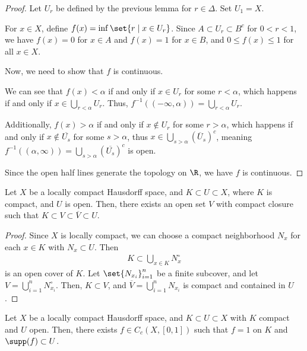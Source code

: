 \documentclass[10pt]{mypackage}
\begin{document}
\begin{proof}
  Let $U_r$ be defined by the previous lemma for $r\in \Delta$. Set $U_1 = X$.\newline

  For $x\in X$, define $f(x) = \inf\set{r\mid x\in U_r}$. Since $A\subset U_r \subset B^{c}$ for $0 < r < 1$, we have $f(x) = 0$ for $x\in A$ and $f(x) = 1$ for $x\in B$, and $0 \leq f(x) \leq 1$ for all $x\in X$.\newline

  Now, we need to show that $f$ is continuous. \newline

  We can see that $f(x) < \alpha$ if and only if $x\in U_{r}$ for some $r < \alpha$, which happens if and only if $x\in \bigcup_{r < \alpha}U_r$. Thus, $f^{-1}\left(\left(-\infty,\alpha\right)\right) = \bigcup_{r < \alpha}U_r$.\newline

  Additionally, $f(x) > \alpha$ if and only if $x\notin U_r$ for some $r > \alpha$, which happens if and only if $x\notin \overline{U_s}$ for some $s > \alpha$, thus $x\in \bigcup_{s > \alpha}\left(\overline{U}_{s}\right)^c$, meaning $f^{-1}\left(\left(\alpha,\infty\right)\right) = \bigcup_{s > \alpha}\left(\overline{U_s}\right)^c$ is open.\newline

  Since the open half lines generate the topology on $\R$, we have $f$ is continuous.
\end{proof}
\begin{proposition}
  Let $X$ be a locally compact Hausdorff space, and $K\subset U\subset X$, where $K$ is compact, and $U$ is open. Then, there exists an open set $V$ with compact closure such that $K\subset V\subset \overline{V}\subset U$.
\end{proposition}
\begin{proof}
  Since $X$ is locally compact, we can choose a compact neighborhood $N_x$ for each $x\in K$ with $N_x\subset U$. Then
  \begin{align*}
    K\subset \bigcup_{x\in K}N_x^{\circ}
  \end{align*}
  is an open cover of $K$. Let $\set{N_{x_i}}_{i=1}^{n}$ be a finite subcover, and let $V = \bigcup_{i=1}^{n}N_{x_i}^{\circ}$. Then, $K\subset V$, and $\overline{V} = \bigcup_{i=1}^{n}N_{x_i}$ is compact and contained in $U$.
\end{proof}
\begin{theorem}
  Let $X$ be a locally compact Hausdorff space, and $K\subset U\subset X$ with $K$ compact and $U$ open. Then, there exists $f\in C_c\left(X,[0,1]\right)$ such that $f = 1$ on $K$ and $\supp(f) \subset U$.
\end{theorem}
\end{document}

